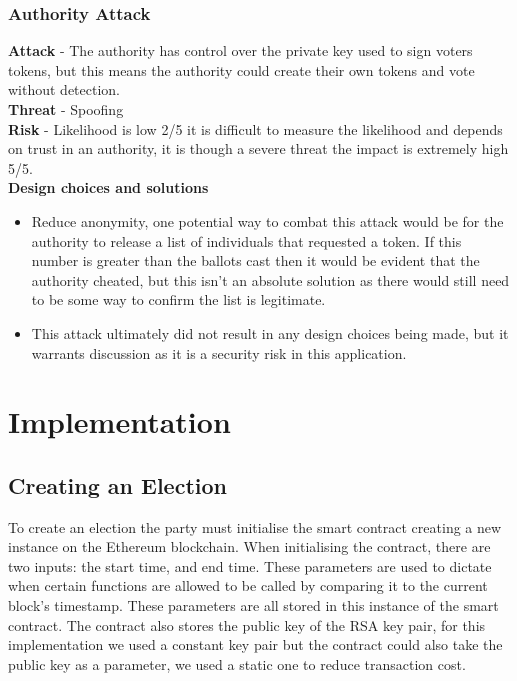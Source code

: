 \documentclass{entcs}
\begin{document}
\subsubsection{Authority Attack} \label{sec: Authority Attack}
\textbf{Attack} - The authority has control over the private key used to sign voters tokens, but this means the authority could create their own tokens and vote without detection. \\
\textbf{Threat} - Spoofing \\
\textbf{Risk} - Likelihood is low 2/5 it is difficult to measure the likelihood and depends on trust in an authority, it is though a severe threat the impact is extremely high 5/5.\\
\textbf{Design choices and solutions}
\begin{itemize}
    \item Reduce anonymity, one potential way to combat this attack would be for the authority to release a list of individuals that requested a token. If this number is greater than the ballots cast then it would be evident that the authority cheated, but this isn't an absolute solution as there would still need to be some way to confirm the list is legitimate.
    \item This attack ultimately did not result in any design choices being made, but it warrants discussion as it is a security risk in this application.
\end{itemize}


\section{Implementation} \label{sec: implementation}

\subsection{Creating an Election}
To create an election the party must initialise the smart contract creating a new instance on the Ethereum blockchain. When initialising the contract, there are two inputs: the start time, and end time. These parameters are used to dictate when certain functions are allowed to be called by comparing it to the current block's timestamp. These parameters are all stored in this instance of the smart contract. The contract also stores the public key of the RSA key pair, for this implementation we used a constant key pair but the contract could also take the public key as a parameter, we used a static one to reduce transaction cost.
\end{document}
